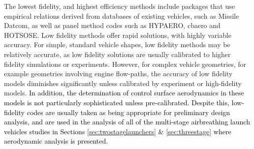 The lowest fidelity, and highest efficiency methods include packages that use empirical relations derived from databases of existing vehicles, such as Missile Datcom\cite{Rosema2011}, as well as panel method codes such as HYPAERO\cite{Preller2017b}, cbaero\cite{Kinney2004} and HOTSOSE\cite{hotsose}. Low fidelity methods offer rapid solutions, with highly variable accuracy. For simple, standard vehicle shapes, low fidelity methods may be relatively accurate, as low fidelity solutions are usually calibrated to higher fidelity simulations or experiments. However, for complex vehicle geometries, for example geometries involving engine flow-paths, the accuracy of low fidelity models diminishes significantly\cite{Krause2011} unless calibrated by experiment or high-fidelity models. \textcolor{black}{In addition, the determination of control surface aerodynamics in these models is not particularly sophisticated unless pre-calibrated. Despite this, low-fidelity codes are usually taken as being appropriate for preliminary design analysis, and are used in the analysis of all of the multi-stage airbreathing launch vehicles studies in Sections \ref{sec:twostagelaunchers} \& \ref{sec:threestage} where aerodynamic analysis is presented\cite{Wilhite1991,Fujikawa2017,Mehta2001,Takahashi1997,Germain2001,Eklund2012,Bradford2002,Kimura1999,Preller2018a}.} 


